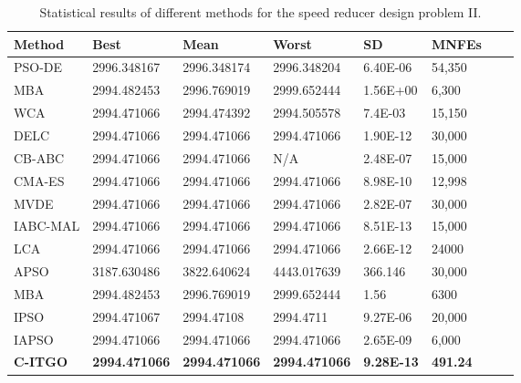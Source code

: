 
\begin{table*}[tp]
    \tiny
    \begin{center}
    
    \begin{tabular}{ P{2.0cm} P{2.0cm} P{2.0cm} P{2.0cm} P{2.0cm} P{2.0cm} P{2.0cm} P{2.0cm}  }
    \hline
    \textbf{Method} & \textbf{Best} & \textbf{Mean} & \textbf{Worst} & \textbf{SD} & \textbf{MNFEs} \\
    \hline
    
    PSO-DE & 2996.348167 & 2996.348174 & 2996.348204 & 6.40E-06 & 54,350 \\
    MBA & 2994.482453 & 2996.769019 & 2999.652444 & 1.56E+00 & 6,300 \\
    WCA & 2994.471066 & 2994.474392 & 2994.505578 & 7.4E-03 & 15,150 \\    
    DELC & 2994.471066 & 2994.471066 & 2994.471066 & 1.90E-12 & 30,000 \\
    CB-ABC & 2994.471066 & 2994.471066 & N/A & 2.48E-07 & 15,000 \\
    CMA-ES & 2994.471066 & 2994.471066 & 2994.471066 & 8.98E-10 & 12,998 \\
    MVDE & 2994.471066 & 2994.471066 & 2994.471066 & 2.82E-07 & 30,000 \\    
    IABC-MAL & 2994.471066 & 2994.471066 & 2994.471066 & 8.51E-13 & 15,000 \\ 
    LCA & 2994.471066 & 2994.471066 & 2994.471066 & 2.66E-12 & 24000 \\
    APSO & 3187.630486 & 3822.640624 & 4443.017639 & 366.146 & 30,000 \\
    MBA & 2994.482453 & 2996.769019 & 2999.652444 & 1.56 & 6300 \\
    IPSO & 2994.471067 & 2994.47108 & 2994.4711 & 9.27E-06 & 20,000 \\
    IAPSO & 2994.471066 & 2994.471066 & 2994.471066 & 2.65E-09 & 6,000 \\
    \textbf{C-ITGO} & \bf{2994.471066} & \bf{2994.471066} & \bf{2994.471066} & \bf{9.28E-13} & \bf{491.24} \\ 
    
  

    \hline
    \end{tabular}
    \end{center}
    \vspace*{-6mm}
    \caption{Statistical results of different methods for the speed reducer design problem II. \\[1em]}
    \label{tab:SP2}
    \end{table*}
    
    